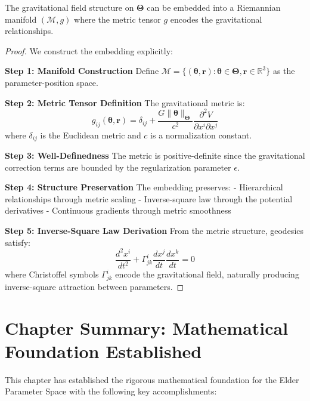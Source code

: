 \begin{theorem}
\label{thm:gravitational_embedding}
The gravitational field structure on $\boldsymbol{\Theta}$ can be embedded into a Riemannian manifold $(\mathcal{M}, g)$ where the metric tensor $g$ encodes the gravitational relationships.
\end{theorem}

\begin{proof}
We construct the embedding explicitly:

\textbf{Step 1: Manifold Construction}
Define $\mathcal{M} = \{(\boldsymbol{\theta}, \mathbf{r}) : \boldsymbol{\theta} \in \boldsymbol{\Theta}, \mathbf{r} \in \mathbb{R}^3\}$ as the parameter-position space.

\textbf{Step 2: Metric Tensor Definition}
The gravitational metric is:
$$g_{ij}(\boldsymbol{\theta}, \mathbf{r}) = \delta_{ij} + \frac{G \|\boldsymbol{\theta}\|_{\boldsymbol{\Theta}}}{c^2} \frac{\partial^2 V}{\partial x^i \partial x^j}$$
where $\delta_{ij}$ is the Euclidean metric and $c$ is a normalization constant.

\textbf{Step 3: Well-Definedness}
The metric is positive-definite since the gravitational correction terms are bounded by the regularization parameter $\epsilon$.

\textbf{Step 4: Structure Preservation}
The embedding preserves:
- Hierarchical relationships through metric scaling
- Inverse-square law through the potential derivatives
- Continuous gradients through metric smoothness

\textbf{Step 5: Inverse-Square Law Derivation}
From the metric structure, geodesics satisfy:
$$\frac{d^2 x^i}{dt^2} + \Gamma^i_{jk} \frac{dx^j}{dt} \frac{dx^k}{dt} = 0$$
where Christoffel symbols $\Gamma^i_{jk}$ encode the gravitational field, naturally producing inverse-square attraction between parameters.
\end{proof}

\section{Chapter Summary: Mathematical Foundation Established}

This chapter has established the rigorous mathematical foundation for the Elder Parameter Space with the following key accomplishments:

